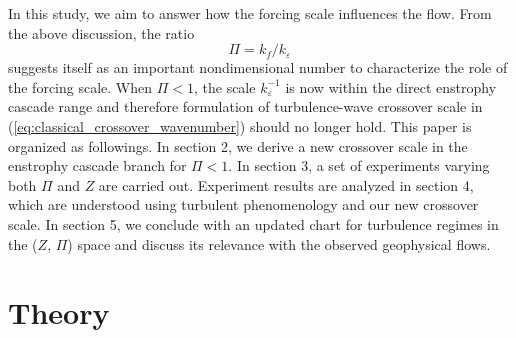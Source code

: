 \documentclass{ametsoc}
\begin{document}
In this study, we aim to answer how the forcing scale influences the
flow. From the above discussion, the ratio
\begin{equation}
\Pi=k_{f}/k_{\varepsilon}\label{eq:def_Pi_index}
\end{equation}
suggests itself as an important nondimensional number to characterize
the role of the forcing scale. When $\Pi<1$, the scale $k_{\varepsilon}^{-1}$
is now within the direct enstrophy cascade range and therefore formulation
of turbulence-wave crossover scale in (\ref{eq:classical_crossover_wavenumber})
should no longer hold. This paper is organized
as followings. In section 2, we derive a new crossover scale in the
enstrophy cascade branch for $\Pi<1$. In section 3, a set of experiments
varying both $\Pi$ and $Z$ are carried out. Experiment results are
analyzed in section 4, which are understood using turbulent phenomenology
and our new crossover scale. In section 5, we conclude with an updated
chart for turbulence regimes in the ($Z$, $\Pi$) space and discuss
its relevance with the observed geophysical flows.


\section{Theory}
\end{document}
